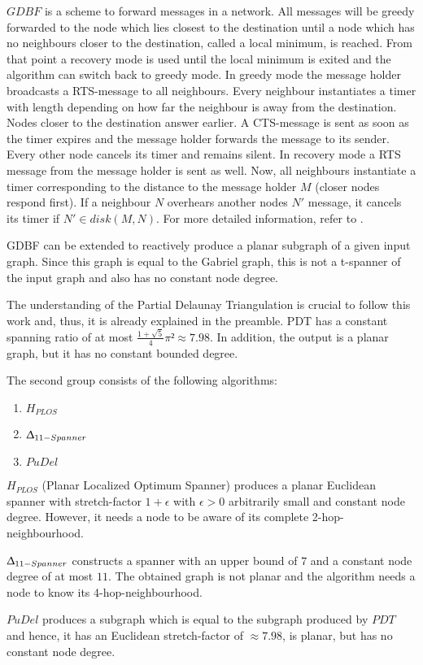 $GDBF $ is a scheme to forward messages in a network.
All messages will be greedy forwarded to the node which lies closest to the destination until a node which has no neighbours closer to the destination, called a local minimum, is reached.
From that point a recovery mode is used until the local minimum is exited and the algorithm can switch back to greedy mode.
In greedy mode the message holder broadcasts a RTS-message to all neighbours.
Every neighbour instantiates a timer with length depending on how far the neighbour is away from the destination. 
Nodes closer to the destination answer earlier.
A CTS-message is sent as soon as the timer expires and the message holder forwards the message to its sender. 
Every other node cancels its timer and remains silent.
In recovery mode a RTS message from the message holder is sent as well.
Now, all neighbours instantiate a timer corresponding to the distance to the message holder $M $ (closer nodes respond first).
If a neighbour $N $ overhears another nodes $N' $ message, it cancels its timer if $N' \in disk(M, N) $.
For more detailed information, refer to \cite{Chawla2006}.

GDBF can be extended to reactively produce a planar subgraph of a given input graph. 
Since this graph is equal to the Gabriel graph, this is not a t-spanner of the input graph and also has no constant node degree.

The understanding of the Partial Delaunay Triangulation is crucial to follow this work and, thus, it is already explained in the preamble.
PDT has a constant spanning ratio of at most $\frac{1+\sqrt{5}}{4}\pi ² \approx 7.98 $.
In addition, the output is a planar graph, but it has no constant bounded degree.


The second group consists of the following algorithms:
\begin{enumerate}
\item $H_{PLOS} $
\item $\Updelta _{11-Spanner} $
\item $PuDel $
\end{enumerate}

$H_{PLOS} $ (Planar Localized Optimum Spanner)\cite{Damian2010} produces a planar Euclidean spanner with stretch-factor $1+ \epsilon $ with $\epsilon >0 $ arbitrarily small and constant node degree.
However, it needs a node to be aware of its complete 2-hop-neighbourhood.

$\Updelta _{11-Spanner} $ \cite{Kanj2012} constructs a spanner with an upper bound of $7 $ and a constant node degree of at most $11 $.
The obtained graph is not planar and the algorithm needs a node to know its 4-hop-neighbourhood.

$PuDel $ \cite{Xu2011} produces a subgraph which is equal to the subgraph produced by $PDT $ \cite{Neumann2012} and hence, it has an Euclidean stretch-factor of $\approx 7.98 $, is planar, but has no constant node degree. 






